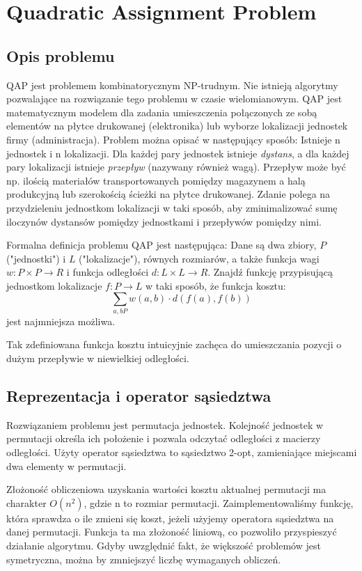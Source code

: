\documentclass[a4paper,10pt]{article}
\begin{document}


\section{Quadratic Assignment Problem}
\subsection{Opis problemu}
QAP jest problemem kombinatorycznym NP-trudnym. 
Nie istnieją algorytmy pozwalające na rozwiązanie tego problemu w czasie wielomianowym.
QAP jest matematycznym modelem dla zadania umieszczenia połączonych ze sobą elementów na płytce drukowanej (elektronika) lub wyborze lokalizacji jednostek firmy (administracja).
Problem można opisać w następujący sposób:
Istnieje n jednostek i n lokalizacji.
Dla każdej pary jednostek istnieje \emph{dystans}, a dla każdej pary lokalizacji istnieje \emph{przepływ} (nazywany również wagą).
Przepływ może być np. ilością materiałów transportowanych pomiędzy magazynem a halą produkcyjną lub szerokością ścieżki na płytce drukowanej.
Zdanie polega na przydzieleniu jednostkom lokalizacji w taki sposób, aby zminimalizować sumę iloczynów dystansów pomiędzy jednostkami i przepływów pomiędzy nimi.

Formalna definicja problemu QAP jest następująca:
Dane są dwa zbiory, $P$ ("jednostki") i $L$ ("lokalizacje"), równych rozmiarów, a także funkcja wagi 
$w: P \times P \rightarrow R$ i funkcja odległości $d: L \times L \rightarrow R$.
Znajdź funkcję przypisującą jednostkom lokalizacje $f: P \rightarrow L$ w taki sposób, że funkcja kosztu:
$$\sum_{a,bP}w(a,b) \cdot d(f(a),f(b))$$
jest najmniejsza możliwa.

Tak zdefiniowana funkcja kosztu intuicyjnie zachęca do umieszczania pozycji o dużym przepływie w niewielkiej odległości.

\subsection{Reprezentacja i operator sąsiedztwa}
Rozwiązaniem problemu jest permutacja jednostek.
Kolejność jednostek w permutacji określa ich położenie i pozwala odczytać odległości z macierzy odległości.
Użyty operator sąsiedztwa to sąsiedztwo 2-opt, zamieniające miejscami dwa elementy w permutacji.

Złożoność obliczeniowa uzyskania wartości kosztu aktualnej permutacji ma charakter $O(n^2)$, gdzie n to rozmiar permutacji.
Zaimplementowaliśmy funkcję, która sprawdza o ile zmieni się koszt, jeżeli użyjemy operatora sąsiedztwa na danej permutacji.
Funkcja ta ma złożoność liniową, co pozwoliło przyspieszyć działanie algorytmu.
Gdyby uwzględnić fakt, że większość problemów jest symetryczna, można by zmniejszyć liczbę wymaganych obliczeń.
\end{document}
